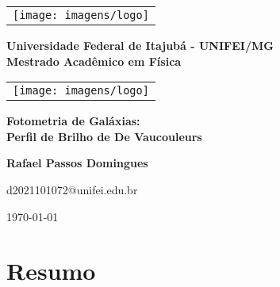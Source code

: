 \documentclass[a4paper, 11pt, fleqn, leqno]{article}
\begin{document}
	
	\begin{center}
		\begin{tabular}{@{}c@{}}
			\texttt{[image: imagens/logo]}
		\end{tabular}%
		\hfill
		\begin{varwidth}{\textwidth}
			\centering\bfseries
			{\large Universidade Federal de Itajubá - UNIFEI/MG \\
				Mestrado Acadêmico em Física}
		\end{varwidth}%
		\hfill
		\begin{tabular}{@{}c@{}}
			\texttt{[image: imagens/logo]}
		\end{tabular}%
	\end{center}

\begin{center}
	
	\vspace{3cm}

	\textbf{\Huge \textbf{Fotometria de Galáxias: \\ \vspace{1cm} Perfil de Brilho de De Vaucouleurs}}
	
	\vspace{3cm}
	
	\textbf{\huge \textbf{Rafael Passos Domingues}}
	
	\vspace{1cm}
	
	{\Large d2021101072@unifei.edu.br}
	
	\vspace{5cm}
	
	\large{\today}	
	
\end{center}

\newpage
\tableofcontents
\newpage


\newpage

\section{Resumo}
\end{document}
